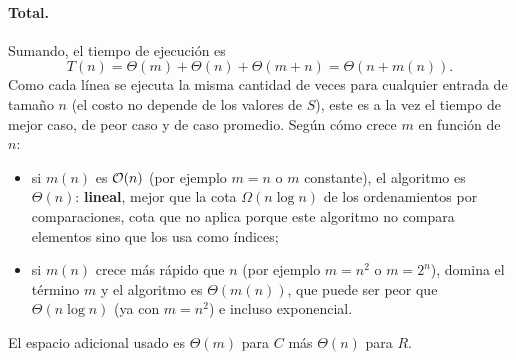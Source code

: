 \paragraph{Total.} Sumando, el tiempo de ejecución es
\[
T(n)=\Theta(m)+\Theta(n)+\Theta(m+n)=\Theta(n+m(n)).
\]
Como cada línea se ejecuta la misma cantidad de veces para cualquier entrada de tamaño $n$
(el costo no depende de los valores de $S$), este es a la vez el tiempo de mejor caso, de peor
caso y de caso promedio. Según cómo crece $m$ en función de $n$:
\begin{itemize}
  \item si $m(n)$ es $\mathcal{O}(n)$ (por ejemplo $m=n$ o $m$ constante), el algoritmo es
        $\Theta(n)$: \textbf{lineal}, mejor que la cota $\Omega(n\log n)$ de los ordenamientos
        por comparaciones, cota que no aplica porque este algoritmo no compara elementos sino que
        los usa como índices;
  \item si $m(n)$ crece más rápido que $n$ (por ejemplo $m=n^2$ o $m=2^n$), domina el término
        $m$ y el algoritmo es $\Theta(m(n))$, que puede ser peor que $\Theta(n\log n)$ (ya con
        $m=n^2$) e incluso exponencial.
\end{itemize}
El espacio adicional usado es $\Theta(m)$ para $C$ más $\Theta(n)$ para $R$.


